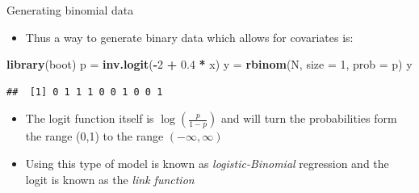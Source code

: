 \documentclass[ignorenonframetext,]{beamer}
\newenvironment{Shaded}{\begin{snugshade}}{\end{snugshade}}
\newcommand{\KeywordTok}[1]{\textcolor[rgb]{0.13,0.29,0.53}{\textbf{#1}}}
\newcommand{\DataTypeTok}[1]{\textcolor[rgb]{0.13,0.29,0.53}{#1}}
\newcommand{\DecValTok}[1]{\textcolor[rgb]{0.00,0.00,0.81}{#1}}
\newcommand{\FloatTok}[1]{\textcolor[rgb]{0.00,0.00,0.81}{#1}}
\newcommand{\StringTok}[1]{\textcolor[rgb]{0.31,0.60,0.02}{#1}}
\newcommand{\OperatorTok}[1]{\textcolor[rgb]{0.81,0.36,0.00}{\textbf{#1}}}
\newcommand{\NormalTok}[1]{#1}
\providecommand{\tightlist}{%
  \setlength{\itemsep}{0pt}\setlength{\parskip}{0pt}}
\begin{document}
\begin{frame}[fragile]{Generating binomial data}

\begin{itemize}
\tightlist
\item
  Thus a way to generate binary data which allows for covariates is:
\end{itemize}

\begin{Shaded}
\begin{Highlighting}[]
\KeywordTok{library}\NormalTok{(boot)}
\NormalTok{p =}\StringTok{ }\KeywordTok{inv.logit}\NormalTok{(}\OperatorTok{-}\DecValTok{2} \OperatorTok{+}\StringTok{ }\FloatTok{0.4} \OperatorTok{*}\StringTok{ }\NormalTok{x)}
\NormalTok{y =}\StringTok{ }\KeywordTok{rbinom}\NormalTok{(N, }\DataTypeTok{size =} \DecValTok{1}\NormalTok{, }\DataTypeTok{prob =}\NormalTok{ p)}
\NormalTok{y}
\end{Highlighting}
\end{Shaded}

\begin{verbatim}
##  [1] 0 1 1 1 0 0 1 0 0 1
\end{verbatim}

\begin{itemize}
\tightlist
\item
  The logit function itself is \(\log \left( \frac{p}{1-p} \right)\) and
  will turn the probabilities form the range (0,1) to the range
  \((-\infty,\infty)\)
\item
  Using this type of model is known as \emph{logistic-Binomial}
  regression and the logit is known as the \emph{link function}
\end{itemize}

\end{frame}
\end{document}
